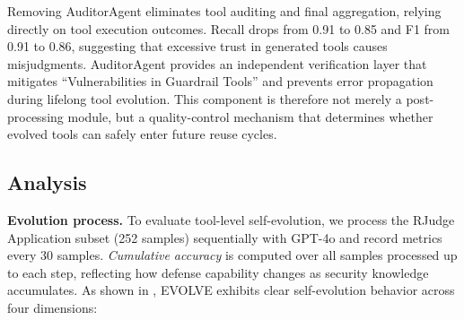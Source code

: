  Removing AuditorAgent eliminates tool auditing and final aggregation, relying directly on tool execution outcomes. Recall drops from 0.91 to 0.85 and F1 from 0.91 to 0.86, suggesting that excessive trust in generated tools causes misjudgments. AuditorAgent provides an independent verification layer that mitigates ``Vulnerabilities in Guardrail Tools'' and prevents error propagation during lifelong tool evolution. This component is therefore not merely a post-processing module, but a quality-control mechanism that determines whether evolved tools can safely enter future reuse cycles.




\subsection{Analysis}
\label{subsec:analysis}

\textbf{Evolution process.} To evaluate tool-level self-evolution, we process the RJudge Application subset (252 samples) sequentially with GPT-4o and record metrics every 30 samples. \emph{Cumulative accuracy} is computed over all samples processed up to each step, reflecting how defense capability changes as security knowledge accumulates. As shown in , EVOLVE exhibits clear self-evolution behavior across four dimensions:

